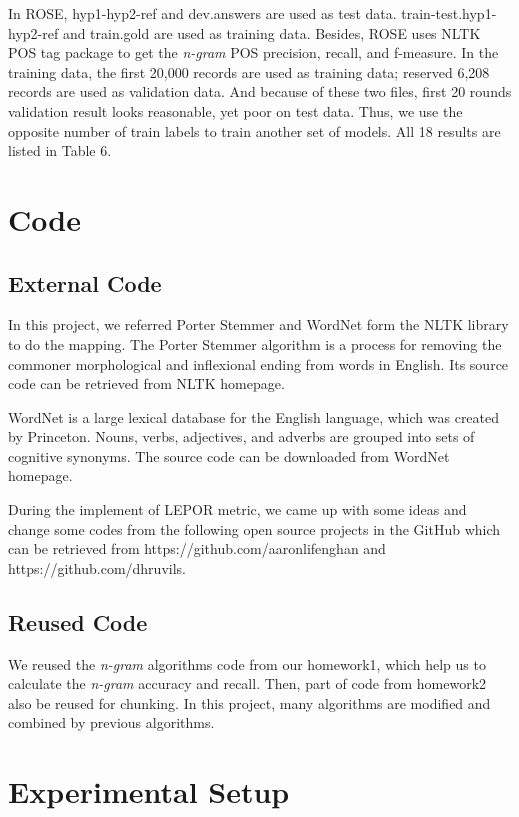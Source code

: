 \documentclass[11pt]{article}
\begin{document}
In ROSE, hyp1-hyp2-ref and dev.answers are used as test data. train-test.hyp1-hyp2-ref and train.gold are used as training data. Besides, ROSE uses NLTK POS tag package to get the \emph{n-gram} POS precision, recall, and f-measure. In the training data, the first 20,000 records are used as training data; reserved 6,208 records are used as validation data. And because of these two files, first 20 rounds validation result looks reasonable, yet poor on test data. Thus, we use the opposite number of train labels to train another set of models. All 18 results are listed in Table 6.

\section{Code}

\subsection{External Code}
In this project, we referred Porter Stemmer and WordNet form the NLTK library to do the mapping. The Porter Stemmer algorithm is a process for removing the commoner morphological and inflexional ending from words in English. Its source code can be retrieved from NLTK homepage. 


WordNet is a large lexical database for the English language, which was created by Princeton. Nouns, verbs, adjectives, and adverbs are grouped into sets of cognitive synonyms. The source code can be downloaded from WordNet homepage.

During the implement of LEPOR metric, we came up with some ideas and change some codes from the following open source projects in the GitHub which can be retrieved from https://github.com/aaronlifenghan and https://github.com/dhruvils.

\subsection{Reused Code}
We reused the \emph{n-gram} algorithms code from our homework1, which help us to calculate the \emph{n-gram} accuracy and recall. Then, part of code from homework2 also be reused for chunking. In this project, many algorithms are modified and combined by previous algorithms.

\section{Experimental Setup}
\end{document}
